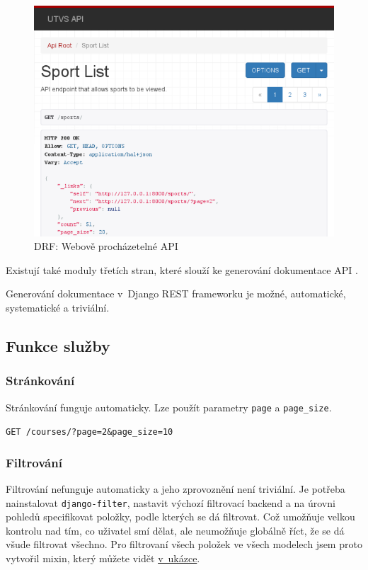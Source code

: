 \begin{figure}
\centering
\includegraphics{images/django-rest-framework-browsable-utvs}
\caption{DRF: Webově procházetelné API\label{pic:djangorestbrowsableutvs}}
\end{figure}

Existují také moduly třetích stran, které slouží ke generování dokumentace API \autocite{drfdocstools}.

Generování dokumentace v~Django REST frameworku je možné, automatické, systematické a triviální.

\subsection{Funkce služby}\label{funkce-sluux17eby}

\subsubsection*{Stránkování}\label{struxe1nkovuxe1nuxed}

Stránkování funguje automaticky. Lze použít parametry \verb!page! a \verb!page_size!.

\verb!GET /courses/?page=2&page_size=10!

\subsubsection*{Filtrování}\label{filtrovuxe1nuxed}

Filtrování nefunguje automaticky a jeho zprovoznění není triviální. Je potřeba nainstalovat \verb!django-filter!, nastavit výchozí filtrovací backend a na úrovni pohledů specifikovat položky, podle kterých se dá filtrovat. Což umožňuje velkou kontrolu nad tím, co uživatel smí dělat, ale neumožňuje globálně říct, že se dá všude filtrovat všechno. Pro filtrovaní všech položek ve všech modelech jsem proto vytvořil mixin, který můžete vidět \protect\hyperlink{code:drf:filter}{v~ukázce}.

